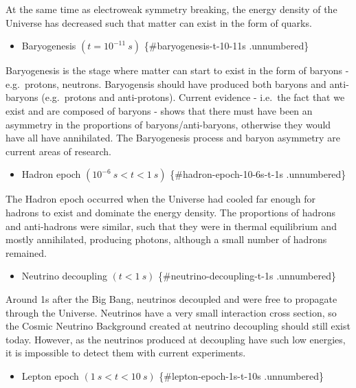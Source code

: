 \documentclass[11pt,a4paper,notoc]{tufte-handout}
\providecommand{\tightlist}{%
  \setlength{\itemsep}{0pt}\setlength{\parskip}{0pt}}
\begin{document}
At the same time as electroweak symmetry breaking, the energy density of
the Universe has decreased such that matter can exist in the form of
quarks.

\begin{itemize}
\tightlist
\item
  Baryogenesis \((t = 10^{-11}~s)\) \{\#baryogenesis-t-10-11s .unnumbered\}
\end{itemize}

Baryogenesis is the stage where matter can start to exist in the form of
baryons - e.g.~protons, neutrons. Baryogensis should have produced both
baryons and anti-baryons (e.g.~protons and anti-protons). Current
evidence - i.e.~the fact that we exist and are composed of baryons -
shows that there must have been an asymmetry in the proportions of
baryons/anti-baryons, otherwise they would have all have annihilated.
The Baryogenesis process and baryon asymmetry are current areas of
research.

\begin{itemize}
\tightlist
\item
  Hadron epoch \((10^{-6}~s < t < 1~s)\) \{\#hadron-epoch-10-6s-t-1s .unnumbered\}
\end{itemize}

The Hadron epoch occurred when the Universe had cooled far enough for
hadrons to exist and dominate the energy density. The proportions of
hadrons and anti-hadrons were similar, such that they were in thermal
equilibrium and mostly annihilated, producing photons, although a small
number of hadrons remained.

\begin{itemize}
\tightlist
\item
  Neutrino decoupling \((t < 1~s)\) \{\#neutrino-decoupling-t-1s .unnumbered\}
\end{itemize}

Around 1s after the Big Bang, neutrinos decoupled and were free to
propagate through the Universe. Neutrinos have a very small interaction
cross section, so the Cosmic Neutrino Background created at neutrino
decoupling should still exist today. However, as the neutrinos produced
at decoupling have such low energies, it is impossible to detect them
with current experiments.

\begin{itemize}
\tightlist
\item
  Lepton epoch \((1~s < t < 10~s)\) \{\#lepton-epoch-1s-t-10s .unnumbered\}
\end{itemize}
\end{document}
